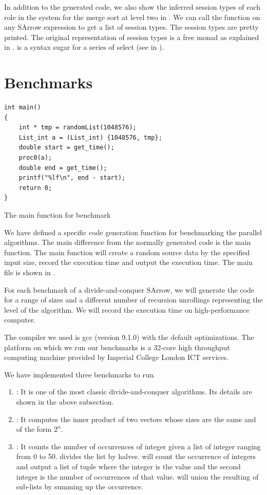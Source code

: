 In addition to the generated code, we also show the inferred session types of each role in the system for the merge sort at level two in . We can call the function  on any SArrow expression to get a list of session types. The session types are pretty printed. The original representation of session types is a free monad as explained in .  is a syntax sugar for a series of select (see in ).

\section{Benchmarks}
\begin{listing}[ht]
\begin{verbatim}
int main()
{
    int * tmp = randomList(1048576);
    List_int a = (List_int) {1048576, tmp};
    double start = get_time();
    proc0(a);
    double end = get_time();
    printf("%lf\n", end - start);
    return 0;
}
\end{verbatim}
    \caption{The main function for benchmark}
    \label{eval:code:main}
\end{listing}
We have defined a specific code generation function for benchmarking the parallel algorithms. The main difference from the normally generated code is the main function. The main function will create a random source data by the specified input size, record the execution time and output the execution time. The main file is shown in . 

For each benchmark of a divide-and-conquer SArrow, we will generate the code for a range of sizes and a different number of recursion unrollings representing the level of the algorithm. We will record the execution time on high-performance computer.

The compiler we used is gcc (version 9.1.0) with the default optimizations. The platform on which we run our benchmarks is a 32-core high throughput computing machine provided by Imperial College London ICT services.

We have implemented three benchmarks to run.
\begin{enumerate}
    \item {}: It is one of the most classic divide-and-conquer algorithms. Its details are shown in the above subsection.
    \item {}: It computes the inner product of two vectors whose sizes are the same and of the form $2^n$.
    \item {}: It counts the number of occurrences of integer given a list of integer ranging from 0 to 50.  divides the list by halves.  will count the occurrence of integers and output a list of tuple where the integer is the value and the second integer is the number of occurrences of that value.  will union the resulting of sub-lists by summing up the occurrence.
\end{enumerate}
